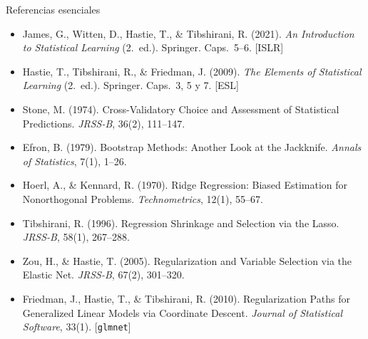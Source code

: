 \documentclass{beamer}
\newcommand{\1}{\mathbb{I}}
\begin{document}
\begin{frame}{Referencias esenciales}
\footnotesize
\begin{itemize}\itemsep2pt
  \item James, G., Witten, D., Hastie, T., \& Tibshirani, R. (2021). \emph{An Introduction to Statistical Learning} (2.\ ed.). Springer. Caps.\ 5--6. [ISLR]
  \item Hastie, T., Tibshirani, R., \& Friedman, J. (2009). \emph{The Elements of Statistical Learning} (2.\ ed.). Springer. Caps.\ 3, 5 y 7. [ESL]
  \item Stone, M. (1974). Cross-Validatory Choice and Assessment of Statistical Predictions. \emph{JRSS-B}, 36(2), 111--147.
  \item Efron, B. (1979). Bootstrap Methods: Another Look at the Jackknife. \emph{Annals of Statistics}, 7(1), 1--26.
  \item Hoerl, A., \& Kennard, R. (1970). Ridge Regression: Biased Estimation for Nonorthogonal Problems. \emph{Technometrics}, 12(1), 55--67.
  \item Tibshirani, R. (1996). Regression Shrinkage and Selection via the Lasso. \emph{JRSS-B}, 58(1), 267--288.
  \item Zou, H., \& Hastie, T. (2005). Regularization and Variable Selection via the Elastic Net. \emph{JRSS-B}, 67(2), 301--320.
  \item Friedman, J., Hastie, T., \& Tibshirani, R. (2010). Regularization Paths for Generalized Linear Models via Coordinate Descent. \emph{Journal of Statistical Software}, 33(1). [\texttt{glmnet}]
\end{itemize}
\normalsize
\end{frame}

\end{document}

